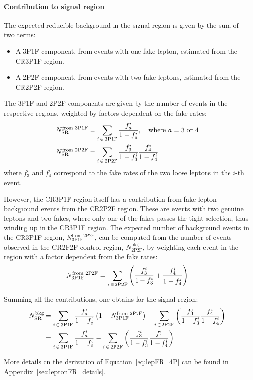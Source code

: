\paragraph{Contribution to signal region\\}
The expected reducible background in the signal region is given by the sum of two terms:
\begin{itemize}
  \item A 3P1F component, from events with one fake lepton, estimated from the CR3P1F region.
  \item A 2P2F component, from events with two fake leptons, estimated from the CR2P2F region.
\end{itemize}

The 3P1F and 2P2F components are given by the number of events in the respective regions, weighted by factors dependent on the fake rates:
\begin{subequations}
  \begin{align}
    \label{eq:lepFR_3P1Fto4P}
    N^{\text{from 3P1F}}_{\text{SR}} &= \sum_{i \,\in\, \text{3P1F}} \frac{f_a^i}{1-f_a^i}, \quad \text{where } a = 3 \text{ or } 4
    \\
    \label{eq:lepFR_2P2Fto4P}
    N^{\text{from 2P2F}}_{\text{SR}} &= \sum_{i \,\in\, \text{2P2F}} \frac{f_3^i}{1-f_3^i} \frac{f_4^i}{1-f_4^i}
  \end{align}
\end{subequations}
where $f_3^i$ and $f_4^i$ correspond to the fake rates of the two loose leptons in the $i$-th event.

However, the CR3P1F region itself has a contribution from fake lepton background events from the CR2P2F region.
These are events with two genuine leptons and two fakes, where only one of the fakes passes the tight selection, thus winding up in the CR3P1F region.
The expected number of background events in the CR3P1F region, $N^{\text{from 2P2F}}_{\text{3P1F}}$,
can be computed from the number of events observed in the CR2P2F control region, $N^{\text{bkg}}_{\text{2P2F}}$,
by weighting each event in the region with a factor dependent from the fake rates:
\begin{equation}
  \label{eq:lepFR_N3P1F}
  N^{\text{from 2P2F}}_{\text{3P1F}} = \sum_{i \,\in\, \text{2P2F}} \left( \frac{f_3^i}{1-f_3^i} + \frac{f_4^i}{1-f_4^j} \right)
\end{equation}

Summing all the contributions, one obtains for the signal region:
\begin{equation}
  \begin{split}
    \label{eq:lepFR_4P}
    N^{\text{bkg}}_{\text{SR}} &= \sum_{i \,\in\, \text{3P1F}} \frac{f_a^i}{1-f_a^i} \left( 1 - N^{\text{from 2P2F}}_{\text{3P1F}} \right)
                               + \sum_{i \,\in\, \text{2P2F}} \left( \frac{f_3^i}{1-f_3^i} \frac{f_4^i}{1-f_4^i} \right)
    \\
                 &= \sum_{i \,\in\, \text{3P1F}} \frac{f_a^i}{1-f_a^i} - \sum_{i \,\in\, \text{2P2F}} \left( \frac{f_3^i}{1-f_3^i} \frac{f_4^i}{1-f_4^i} \right)
  \end{split}
\end{equation}

More details on the derivation of Equation~\ref{eq:lepFR_4P} can be found in Appendix~\ref{sec:leptonFR_details}.
